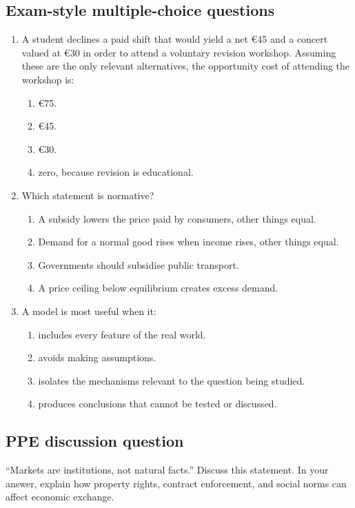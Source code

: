 \subsection*{Exam-style multiple-choice questions}
\begin{enumerate}[resume,label=\arabic*.]
  \item A student declines a paid shift that would yield a net \euro45 and a concert valued at \euro30 in order to attend a voluntary revision workshop. Assuming these are the only relevant alternatives, the opportunity cost of attending the workshop is:
  \begin{enumerate}[label=(\alph*)]
    \item \euro75.
    \item \euro45.
    \item \euro30.
    \item zero, because revision is educational.
  \end{enumerate}

  \item Which statement is normative?
  \begin{enumerate}[label=(\alph*)]
    \item A subsidy lowers the price paid by consumers, other things equal.
    \item Demand for a normal good rises when income rises, other things equal.
    \item Governments should subsidise public transport.
    \item A price ceiling below equilibrium creates excess demand.
  \end{enumerate}

  \item A model is most useful when it:
  \begin{enumerate}[label=(\alph*)]
    \item includes every feature of the real world.
    \item avoids making assumptions.
    \item isolates the mechanisms relevant to the question being studied.
    \item produces conclusions that cannot be tested or discussed.
  \end{enumerate}
\end{enumerate}

\subsection*{PPE discussion question}

\noindent ``Markets are institutions, not natural facts.'' Discuss this statement. In your answer, explain how property rights, contract enforcement, and social norms can affect economic exchange.

